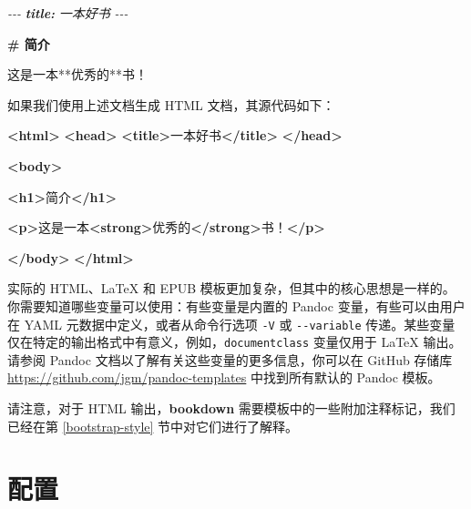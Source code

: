 \documentclass[
  12pt,
]{krantz}
\newenvironment{Shaded}{\begin{snugshade}}{\end{snugshade}}
\newcommand{\AnnotationTok}[1]{\textcolor[rgb]{0.56,0.35,0.01}{\textbf{\textit{#1}}}}
\newcommand{\CommentTok}[1]{\textcolor[rgb]{0.56,0.35,0.01}{\textit{#1}}}
\newcommand{\FunctionTok}[1]{\textcolor[rgb]{0.13,0.29,0.53}{\textbf{#1}}}
\newcommand{\KeywordTok}[1]{\textcolor[rgb]{0.13,0.29,0.53}{\textbf{#1}}}
\newcommand{\NormalTok}[1]{#1}
\theoremstyle{definition}
\theoremstyle{definition}
\theoremstyle{definition}
\theoremstyle{definition}
\theoremstyle{remark}
\begin{document}
\begin{Shaded}
\begin{Highlighting}[]
\CommentTok{{-}{-}{-}}
\AnnotationTok{title:}\CommentTok{ 一本好书}
\CommentTok{{-}{-}{-}}

\FunctionTok{\# 简介}

\NormalTok{这是一本**优秀的**书！}
\end{Highlighting}
\end{Shaded}

如果我们使用上述文档生成 HTML 文档，其源代码如下：

\begin{Shaded}
\begin{Highlighting}[]
\KeywordTok{\textless{}html\textgreater{}}
  \KeywordTok{\textless{}head\textgreater{}}
    \KeywordTok{\textless{}title\textgreater{}}\NormalTok{一本好书}\KeywordTok{\textless{}/title\textgreater{}}
  \KeywordTok{\textless{}/head\textgreater{}}
  
  \KeywordTok{\textless{}body\textgreater{}}
  
  \KeywordTok{\textless{}h1\textgreater{}}\NormalTok{简介}\KeywordTok{\textless{}/h1\textgreater{}}
  
  \KeywordTok{\textless{}p\textgreater{}}\NormalTok{这是一本}\KeywordTok{\textless{}strong\textgreater{}}\NormalTok{优秀的}\KeywordTok{\textless{}/strong\textgreater{}}\NormalTok{书！}\KeywordTok{\textless{}/p\textgreater{}}
  
  \KeywordTok{\textless{}/body\textgreater{}}
\KeywordTok{\textless{}/html\textgreater{}}
\end{Highlighting}
\end{Shaded}

实际的 HTML、LaTeX 和 EPUB 模板更加复杂，但其中的核心思想是一样的。你需要知道哪些变量可以使用：有些变量是内置的 Pandoc 变量，有些可以由用户在 YAML 元数据中定义，或者从命令行选项 \texttt{-V} 或 \texttt{-\/-variable} 传递。某些变量仅在特定的输出格式中有意义，例如，\texttt{documentclass} 变量仅用于 LaTeX 输出。请参阅 Pandoc 文档以了解有关这些变量的更多信息，你可以在 GitHub 存储库 \url{https://github.com/jgm/pandoc-templates} 中找到所有默认的 Pandoc 模板。

请注意，对于 HTML 输出，\textbf{bookdown} 需要模板中的一些附加注释标记，我们已经在第 \ref{bootstrap-style} 节中对它们进行了解释。

\hypertarget{configuration}{%
\section{配置}\label{configuration}}
\end{document}
